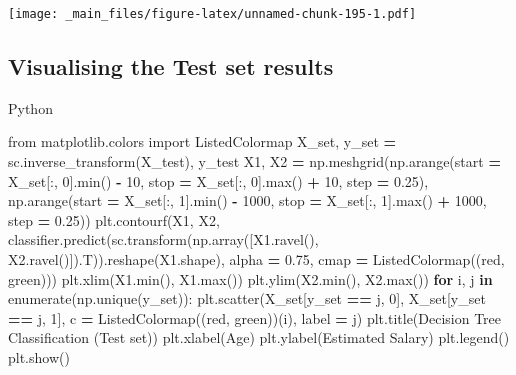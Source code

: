 \documentclass[
]{book}
\newenvironment{Shaded}{\begin{snugshade}}{\end{snugshade}}
\newcommand{\BuiltInTok}[1]{#1}
\newcommand{\ControlFlowTok}[1]{\textcolor[rgb]{0.13,0.29,0.53}{\textbf{#1}}}
\newcommand{\DecValTok}[1]{\textcolor[rgb]{0.00,0.00,0.81}{#1}}
\newcommand{\FloatTok}[1]{\textcolor[rgb]{0.00,0.00,0.81}{#1}}
\newcommand{\ImportTok}[1]{#1}
\newcommand{\KeywordTok}[1]{\textcolor[rgb]{0.13,0.29,0.53}{\textbf{#1}}}
\newcommand{\NormalTok}[1]{#1}
\newcommand{\OperatorTok}[1]{\textcolor[rgb]{0.81,0.36,0.00}{\textbf{#1}}}
\newcommand{\StringTok}[1]{\textcolor[rgb]{0.31,0.60,0.02}{#1}}
\theoremstyle{definition}
\theoremstyle{definition}
\theoremstyle{definition}
\theoremstyle{definition}
\theoremstyle{remark}
\begin{document}
\texttt{[image: \_main\_files/figure-latex/unnamed-chunk-195-1.pdf]}

\hypertarget{visualising-the-test-set-results-6}{%
\subsection{Visualising the Test set results}\label{visualising-the-test-set-results-6}}

Python

\begin{Shaded}
\begin{Highlighting}[]
\ImportTok{from}\NormalTok{ matplotlib.colors }\ImportTok{import}\NormalTok{ ListedColormap}
\NormalTok{X\_set, y\_set }\OperatorTok{=}\NormalTok{ sc.inverse\_transform(X\_test), y\_test}
\NormalTok{X1, X2 }\OperatorTok{=}\NormalTok{ np.meshgrid(np.arange(start }\OperatorTok{=}\NormalTok{ X\_set[:, }\DecValTok{0}\NormalTok{].}\BuiltInTok{min}\NormalTok{() }\OperatorTok{{-}} \DecValTok{10}\NormalTok{, stop }\OperatorTok{=}\NormalTok{ X\_set[:, }\DecValTok{0}\NormalTok{].}\BuiltInTok{max}\NormalTok{() }\OperatorTok{+} \DecValTok{10}\NormalTok{, step }\OperatorTok{=} \FloatTok{0.25}\NormalTok{),}
\NormalTok{                     np.arange(start }\OperatorTok{=}\NormalTok{ X\_set[:, }\DecValTok{1}\NormalTok{].}\BuiltInTok{min}\NormalTok{() }\OperatorTok{{-}} \DecValTok{1000}\NormalTok{, stop }\OperatorTok{=}\NormalTok{ X\_set[:, }\DecValTok{1}\NormalTok{].}\BuiltInTok{max}\NormalTok{() }\OperatorTok{+} \DecValTok{1000}\NormalTok{, step }\OperatorTok{=} \FloatTok{0.25}\NormalTok{))}
\NormalTok{plt.contourf(X1, X2, classifier.predict(sc.transform(np.array([X1.ravel(), X2.ravel()]).T)).reshape(X1.shape),}
\NormalTok{             alpha }\OperatorTok{=} \FloatTok{0.75}\NormalTok{, cmap }\OperatorTok{=}\NormalTok{ ListedColormap((}\StringTok{\textquotesingle{}red\textquotesingle{}}\NormalTok{, }\StringTok{\textquotesingle{}green\textquotesingle{}}\NormalTok{)))}
\NormalTok{plt.xlim(X1.}\BuiltInTok{min}\NormalTok{(), X1.}\BuiltInTok{max}\NormalTok{())}
\NormalTok{plt.ylim(X2.}\BuiltInTok{min}\NormalTok{(), X2.}\BuiltInTok{max}\NormalTok{())}
\ControlFlowTok{for}\NormalTok{ i, j }\KeywordTok{in} \BuiltInTok{enumerate}\NormalTok{(np.unique(y\_set)):}
\NormalTok{    plt.scatter(X\_set[y\_set }\OperatorTok{==}\NormalTok{ j, }\DecValTok{0}\NormalTok{], X\_set[y\_set }\OperatorTok{==}\NormalTok{ j, }\DecValTok{1}\NormalTok{], c }\OperatorTok{=}\NormalTok{ ListedColormap((}\StringTok{\textquotesingle{}red\textquotesingle{}}\NormalTok{, }\StringTok{\textquotesingle{}green\textquotesingle{}}\NormalTok{))(i), label }\OperatorTok{=}\NormalTok{ j)}
\NormalTok{plt.title(}\StringTok{\textquotesingle{}Decision Tree Classification (Test set)\textquotesingle{}}\NormalTok{)}
\NormalTok{plt.xlabel(}\StringTok{\textquotesingle{}Age\textquotesingle{}}\NormalTok{)}
\NormalTok{plt.ylabel(}\StringTok{\textquotesingle{}Estimated Salary\textquotesingle{}}\NormalTok{)}
\NormalTok{plt.legend()}
\NormalTok{plt.show()}
\end{Highlighting}
\end{Shaded}
\end{document}
